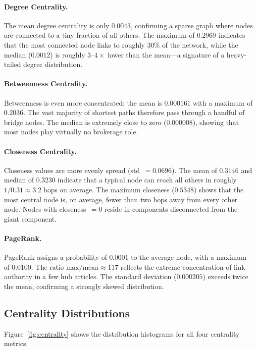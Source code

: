 \documentclass[12pt,a4paper]{article}
\begin{document}
\paragraph{Degree Centrality.}
The mean degree centrality is only $0.0043$, confirming a sparse graph where
nodes are connected to a tiny fraction of all others.  The maximum of $0.2969$
indicates that the most connected node links to roughly $30\%$ of the network,
while the median ($0.0012$) is roughly $3$--$4\times$ lower than the mean---a
signature of a heavy-tailed degree distribution.

\paragraph{Betweenness Centrality.}
Betweenness is even more concentrated: the mean is $0.000161$ with a maximum
of $0.2036$.  The vast majority of shortest paths therefore pass through a
handful of bridge nodes.  The median is extremely close to zero ($0.000008$),
showing that most nodes play virtually no brokerage role.

\paragraph{Closeness Centrality.}
Closeness values are more evenly spread (std~$=0.0696$).  The mean of $0.3146$
and median of $0.3230$ indicate that a typical node can reach all others in
roughly $1/0.31 \approx 3.2$ hops on average.  The maximum closeness ($0.5348$)
shows that the most central node is, on average, fewer than two hops away from
every other node.  Nodes with closeness~$= 0$ reside in components disconnected
from the giant component.

\paragraph{PageRank.}
PageRank assigns a probability of $0.0001$ to the average node, with a maximum
of $0.0100$.  The ratio $\text{max}/\text{mean} \approx 117$ reflects the
extreme concentration of link authority in a few hub articles.  The standard
deviation ($0.000205$) exceeds twice the mean, confirming a strongly skewed
distribution.

\subsection{Centrality Distributions}

Figure~\ref{fig:centrality} shows the distribution histograms for all four
centrality metrics.
\end{document}

